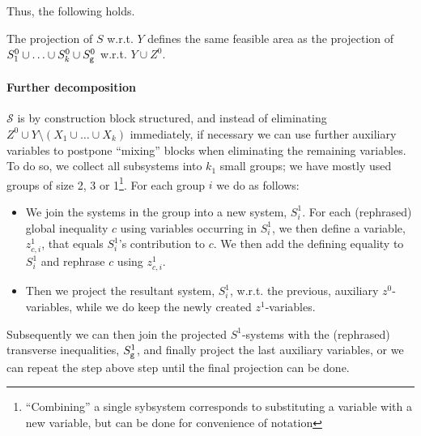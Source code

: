 Thus, the following holds. 
\begin{prop}
The projection of $S$ w.r.t. $Y$ defines the same feasible area as the projection of $S^0_1\cup\ldots\cup S^0_k\cup S^0_{\texttt{g}}$ w.r.t. $Y\cup Z^0$. 
\end{prop}

\paragraph{Further decomposition}
$\mathcal{S}$ is by construction block structured, and instead of eliminating $Z^0\cup Y\setminus(X_1\cup\ldots\cup X_k)$ immediately, if necessary we can use further auxiliary variables to postpone ``mixing'' blocks when eliminating the remaining variables. 
To do so, we collect all subsystems into $k_1$ small groups; we have mostly used groups of size 2, 3 or 1\footnote{``Combining'' a single sybsystem corresponds to substituting a variable with a new variable, but can be done for convenience of notation}.
For each group $i$ we do as follows:
\begin{itemize}\itemsep0em
\item We join the systems in the group into a new system, $S^1_i$. For each (rephrased) global inequality $c$ using variables occurring in $S^1_i$, we then define a variable, $z^1_{c,i}$, that equals $S^1_i$'s contribution to $c$. We then add the defining equality to $S^1_i$ and rephrase $c$ using $z^1_{c,i}$.

\item Then we project the resultant system, $S^1_i$, w.r.t. the previous, auxiliary $z^0$-variables, while we do keep the newly created $z^1$-variables.
\end{itemize} 
Subsequently we can then join the projected $S^1$-systems with the (rephrased) transverse inequalities, $S_{\texttt{g}}^1$, and finally project the last auxiliary variables, or we can repeat the step above step until the final projection can be done. 


